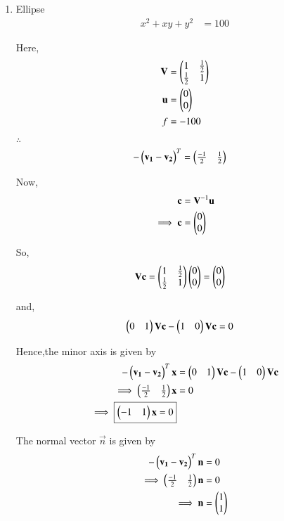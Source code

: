 \documentclass[journal,12pt,twocolumn]{IEEEtran}
\begin{document}
\begin{enumerate}
    \item Ellipse
    \begin{align}
        x^2+xy+y^2 &= 100
    \end{align}
    
    Here,
    \begin{align}
    \mathbf{V} &= \begin{pmatrix}1 & \frac{1}{2} \\ \frac{1}{2} & 1\end{pmatrix} \\
    \mathbf{u} &= \begin{pmatrix}0 \\ 0\end{pmatrix} \\
    f &= -100
    \end{align}

    $\therefore$
    \begin{align}
    -\begin{pmatrix}\mathbf{v_1}-\mathbf{v_2}\end{pmatrix}^T &= \begin{pmatrix}\frac{-1}{2} & \frac{1}{2}\end{pmatrix}
    \end{align}

    Now,
    \begin{align}
    \mathbf{c} &= \mathbf{V}^{-1}\mathbf{u}\\
    \implies \mathbf{c} &= \begin{pmatrix}0 \\ 0\end{pmatrix}
    \end{align}

    So,
    \begin{align}
    \mathbf{V}\mathbf{c} &= \begin{pmatrix}1 & \frac{1}{2} \\ \frac{1}{2} & 1\end{pmatrix}\begin{pmatrix}0 \\ 0\end{pmatrix}=\begin{pmatrix}0 \\ 0\end{pmatrix}
    \end{align}

    and,
    \begin{align}
    \begin{pmatrix}0 & 1\end{pmatrix}\mathbf{V}\mathbf{c} - \begin{pmatrix}1&0\end{pmatrix}\mathbf{V}\mathbf{c} &= 0
    \end{align}

    Hence,the minor axis is given by
    \begin{align}
    -\begin{pmatrix}\mathbf{v_1}-\mathbf{v_2}\end{pmatrix}^T\mathbf{x} &= \begin{pmatrix}0 & 1\end{pmatrix}\mathbf{V}\mathbf{c} - \begin{pmatrix}1 & 0\end{pmatrix}\mathbf{V}\mathbf{c} \\
    \implies \begin{pmatrix}\frac{-1}{2} & \frac{1}{2}\end{pmatrix}\mathbf{x} &= 0 \\
    \implies \boxed{\begin{pmatrix}-1 & 1\end{pmatrix}\mathbf{x} = 0}
    \end{align}
    
    The normal vector $\vec{n}$ is given by
    \begin{align}
        -\begin{pmatrix}\mathbf{v_1}-\mathbf{v_2}\end{pmatrix}^T\mathbf{n} &= 0
        \\
        \implies \begin{pmatrix}\frac{-1}{2} & \frac{1}{2}\end{pmatrix}\mathbf{n} &= 0
        \\
        \implies \mathbf{n} &= \begin{pmatrix}1 \\ 1\end{pmatrix}
    \end{align}
    

\end{enumerate}
\end{document}
